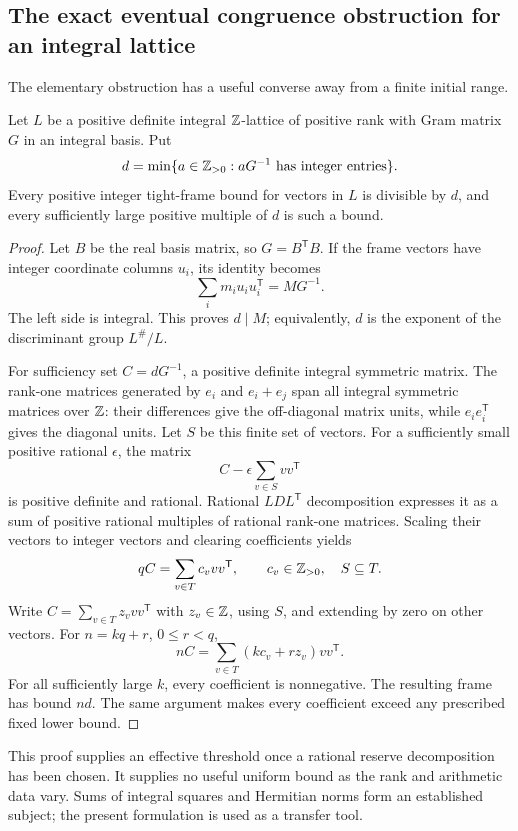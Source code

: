 \subsection{The exact eventual congruence obstruction for an integral lattice}

The elementary obstruction has a useful converse away from a finite initial range.

\begin{theorem}\label{thm:real-eventual}
Let $L$ be a positive definite integral $\mathbb Z$-lattice of positive rank with Gram matrix $G$ in an integral basis. Put
\[
 d=\min\{a\in\mathbb Z_{>0}:aG^{-1}\text{ has integer entries}\}.
\]
Every positive integer tight-frame bound for vectors in $L$ is divisible by $d$, and every sufficiently large positive multiple of $d$ is such a bound.
\end{theorem}

\begin{proof}
Let $B$ be the real basis matrix, so $G=B^{\mathsf T}B$. If the frame vectors have integer coordinate columns $u_i$, its identity becomes
\[
 \sum_i m_i u_i u_i^{\mathsf T}=M G^{-1}.
\]
The left side is integral. This proves $d\mid M$; equivalently, $d$ is the exponent of the discriminant group $L^\#/L$.

For sufficiency set $C=dG^{-1}$, a positive definite integral symmetric matrix. The rank-one matrices generated by $e_i$ and $e_i+e_j$ span all integral symmetric matrices over $\mathbb Z$: their differences give the off-diagonal matrix units, while $e_ie_i^{\mathsf T}$ gives the diagonal units. Let $S$ be this finite set of vectors. For a sufficiently small positive rational $\epsilon$, the matrix
\[
 C-\epsilon\sum_{v\in S}vv^{\mathsf T}
\]
is positive definite and rational. Rational $LDL^{\mathsf T}$ decomposition expresses it as a sum of positive rational multiples of rational rank-one matrices. Scaling their vectors to integer vectors and clearing coefficients yields
\[
 qC=\sum_{v\in T}c_vvv^{\mathsf T},\qquad c_v\in\mathbb Z_{>0},\quad S\subseteq T.
\]
Write $C=\sum_{v\in T}z_vvv^{\mathsf T}$ with $z_v\in\mathbb Z$, using $S$, and extending by zero on other vectors. For $n=kq+r$, $0\le r<q$,
\[
 nC=\sum_{v\in T}(kc_v+rz_v)vv^{\mathsf T}.
\]
For all sufficiently large $k$, every coefficient is nonnegative. The resulting frame has bound $nd$. The same argument makes every coefficient exceed any prescribed fixed lower bound.
\end{proof}

This proof supplies an effective threshold once a rational reserve decomposition has been chosen. It supplies no useful uniform bound as the rank and arithmetic data vary. Sums of integral squares and Hermitian norms form an established subject; the present formulation is used as a transfer tool.\cite{BCIL}

